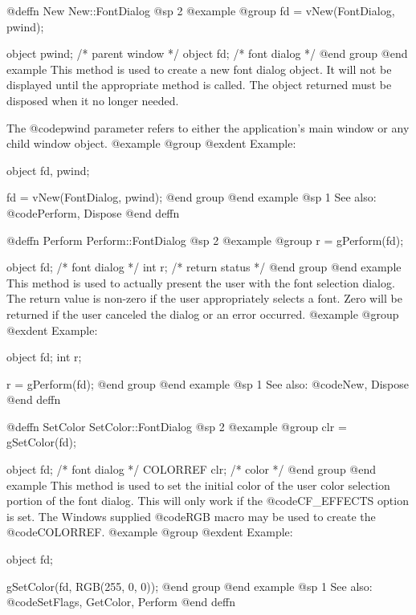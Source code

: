 @deffn {New} New::FontDialog
@sp 2
@example
@group
fd = vNew(FontDialog, pwind);

object  pwind;  /*  parent window  */
object  fd;     /*  font dialog    */
@end group
@end example
This method is used to create a new font dialog object.  It will not be
displayed until the appropriate method is called.  The object returned
must be disposed when it no longer needed.

The @code{pwind} parameter refers to either the application's main window
or any child window object.
@example
@group
@exdent Example:

object  fd, pwind;

fd = vNew(FontDialog, pwind);
@end group
@end example
@sp 1
See also:  @code{Perform, Dispose}
@end deffn









@deffn {Perform} Perform::FontDialog
@sp 2
@example
@group
r = gPerform(fd);

object  fd;     /*  font dialog    */
int     r;      /*  return status  */
@end group
@end example
This method is used to actually present the user with the font
selection dialog.  The return value is non-zero if the user appropriately
selects a font.  Zero will be returned if the user canceled the dialog
or an error occurred.
@example
@group
@exdent Example:

object  fd;
int     r;

r = gPerform(fd);
@end group
@end example
@sp 1
See also:  @code{New, Dispose}
@end deffn









@deffn {SetColor} SetColor::FontDialog
@sp 2
@example
@group
clr = gSetColor(fd);

object   fd;    /*  font dialog  */
COLORREF clr;   /*  color        */
@end group
@end example
This method is used to set the initial color of the user color selection
portion of the font dialog.  This will only work if the
@code{CF_EFFECTS} option is set.  The Windows supplied @code{RGB} macro
may be used to create the @code{COLORREF}.
@example
@group
@exdent Example:

object  fd;

gSetColor(fd, RGB(255, 0, 0));
@end group
@end example
@sp 1
See also:  @code{SetFlags, GetColor, Perform}
@end deffn











